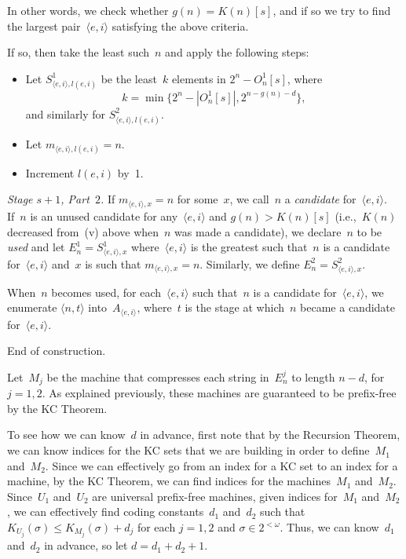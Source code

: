 \documentclass{LMCS}
\newcommand{\0}{\mathbf{0}}
\newcommand{\ei}{{\langle e,i\rangle}}
\newcommand{\<}{\langle}
\renewcommand{\>}{\rangle}
\begin{document}
\noindent In other words, we check whether $g(n)= K(n)[s]$, and if so
we try to find the largest pair~$\ei$ satisfying the above criteria.

If so, then take the least such~$n$ and apply the following steps:

\begin{itemize}
\item Let $S^1_{\ei,l(e,i)}$ be the least~$k$ elements in $2^n-O^1_n[s]$,
where
$$
k=\min\{2^n-|O^1_n[s]|, 2^{n-g(n)-d}\},
$$
and similarly for $S^2_{\ei,l(e,i)}$.
\item Let $m_{\ei,l(e,i)}=n$.
\item Increment $l(e,i)$ by~1.
\end{itemize}

{\em Stage $s+1$, Part~$2$.} If $m_{\ei, x}=n$ for some~$x$, we call~$n$ a
{\em candidate} for~$\ei$. If~$n$ is an unused candidate for any~$\ei$ and
$g(n)>K(n)[s]$ (i.e.,~$K(n)$ decreased from~(v) above when~$n$ was made a
candidate), we declare~$n$ to be {\em used} and let $E^1_n=S^1_{\ei,x}$
where~$\ei$ is the greatest such that~$n$ is a candidate for~$\ei$ and~$x$ is
such that $m_{\ei, x}=n$. Similarly, we define $E^2_n=S^2_{\ei,x}$.

When~$n$ becomes used, for each~$\ei$ such that~$n$ is a candidate for~$\ei$,
we enumerate $\langle n, t\rangle$ into~$A_\ei$, where~$t$ is the stage at
which~$n$ became a candidate for~$\ei$.

End of construction.

\medskip
Let~$M_j$ be the machine that compresses each string in~$E_n^j$ to length
$n-d$, for $j=1,2$.
As explained previously, these machines are guaranteed to be prefix-free by
the KC Theorem.

To see how we can know~$d$ in advance, first note that by the Recursion
Theorem, we can know indices for the KC sets that we are building in order to
define~$M_1$ and~$M_2$.  Since we can effectively go from an index for a KC
set to an index for a machine, by the KC Theorem, we can find indices for the
machines~$M_1$ and~$M_2$.  Since~$U_1$ and~$U_2$ are universal prefix-free
machines, given indices for~$M_1$ and~$M_2$, we can effectively find coding
constants~$d_1$ and~$d_2$ such that $K_{U_j}(\sigma)\leq K_{M_j}(\sigma)
+d_j$ for each $j=1,2$ and $\sigma\in 2^{<\omega}$.  Thus, we can know~$d_1$
and~$d_2$ in advance, so let $d=d_1+d_2+1$.
\end{document}
